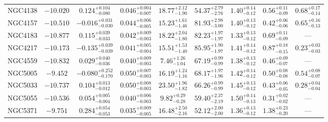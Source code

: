 \documentclass[twocolumn,tighten]{aastex63}
\begin{document}
\begin{table}
\begin{center}
\begin{tabular}{lcccccccc}
    NGC4138 & $ -10.020  $ & $ 0.124 _{ -0.080 } ^{ + 0.104 } $ & $ 0.046 _{ -0.007 } ^{ + 0.004 } $ & $ 18.77 _{ -1.90 } ^{ + 2.12 } $ & $ 54.37 _{ -2.76 } ^{ + 2.79 } $ & $ 1.40 _{ -0.12 } ^{ + 0.14 } $ & $ 0.56 _{ -0.09 } ^{ + 0.11 } $ & $ 0.68 _{ -0.14 } ^{ + 0.17 } $  \\  
    NGC4157 & $ -10.510  $ & $ -0.016 _{ -0.030 } ^{ + 0.031 } $ & $ 0.044 _{ -0.005 } ^{ + 0.006 } $ & $ 15.23 _{ -1.46 } ^{ + 1.61 } $ & $ 81.93 _{ -3.00 } ^{ + 2.98 } $ & $ 1.40 _{ -0.12 } ^{ + 0.13 } $ & $ 0.42 _{ -0.06 } ^{ + 0.06 } $ & $ 0.65 _{ -0.13 } ^{ + 0.16 } $  \\  
    NGC4183 & $ -10.877 $ & $ 0.115 _{ -0.033 } ^{ + 0.039 } $ & $ 0.042 _{ -0.003 } ^{ + 0.009 } $ & $ 18.22 _{ -1.80 } ^{ + 2.04 } $ & $ 82.23 _{ -1.97 } ^{ + 1.97 } $ & $ 1.33 _{ -0.12 } ^{ + 0.13 } $ & $ 0.69 _{ -0.09 } ^{ + 0.11 } $ & --- \\  
    NGC4217 & $ -10.173  $ & $ -0.135 _{ -0.039 } ^{ + 0.039 } $ & $ 0.041 _{ -0.004 } ^{ + 0.005 } $ & $ 15.51 _{ -1.40 } ^{ + 1.53 } $ & $ 85.95 _{ -1.97 } ^{ + 1.90 } $ & $ 1.41 _{ -0.12 } ^{ + 0.14 } $ & $ 0.87 _{ -0.15 } ^{ + 0.18 } $ & $ 0.23 _{ -0.03 } ^{ + 0.03 } $  \\  
    NGC4559 & $ -10.832 $ & $ 0.029 _{ -0.036 } ^{ + 0.040 } $ & $ 0.040 _{ -0.003 } ^{ + 0.009 } $ & $ 7.46 _{ -1.04 } ^{ + 1.26 } $ & $ 67.19 _{ -0.99 } ^{ + 0.99 } $ & $ 1.38 _{ -0.12 } ^{ + 0.13 } $ & $ 0.46 _{ -0.07 } ^{ + 0.09 } $ & --- \\  
    NGC5005 & $ -9.452  $ & $ -0.080 _{ -0.170 } ^{ + 0.252 } $ & $ 0.050 _{ -0.003 } ^{ + 0.007 } $ & $ 16.19 _{ -1.16 } ^{ + 1.24 } $ & $ 68.17 _{ -1.96 } ^{ + 1.97 } $ & $ 1.42 _{ -0.12 } ^{ + 0.14 } $ & $ 0.50 _{ -0.08 } ^{ + 0.08 } $ & $ 0.54 _{ -0.07 } ^{ + 0.08 } $  \\  
    NGC5033 & $ -10.737  $ & $ 0.104 _{ -0.012 } ^{ + 0.013 } $ & $ 0.050 _{ -0.003 } ^{ + 0.008 } $ & $ 23.50 _{ -1.82 } ^{ + 1.96 } $ & $ 66.26 _{ -0.99 } ^{ + 0.99 } $ & $ 1.45 _{ -0.12 } ^{ + 0.13 } $ & $ 0.43 _{ -0.05 } ^{ + 0.06 } $ & $ 0.28 _{ -0.04 } ^{ + 0.04 } $  \\  
    NGC5055 & $ -10.536 $ & $ 0.054 _{ -0.004 } ^{ + 0.005 } $ & $ 0.040 _{ -0.003 } ^{ + 0.006 } $ & $ 9.82 _{ -0.28 } ^{ + 0.29 } $ & $ 59.40 _{ -2.19 } ^{ + 2.37 } $ & $ 1.50 _{ -0.13 } ^{ + 0.14 } $ & $ 0.31 _{ -0.02 } ^{ + 0.02 } $ & --- \\  
    NGC5371 & $ -9.751 $ & $ 0.284 _{ -0.053 } ^{ + 0.054 } $ & $ 0.035 _{ -0.005 } ^{ + 0.009 } $ & $ 16.48 _{ -2.16 } ^{ + 2.50 } $ & $ 52.12 _{ -2.00 } ^{ + 2.00 } $ & $ 1.36 _{ -0.12 } ^{ + 0.13 } $ & $ 1.38 _{ -0.20 } ^{ + 0.23 } $ & --- \\  

\end{tabular}
\end{center}
\end{table}
\end{document}
